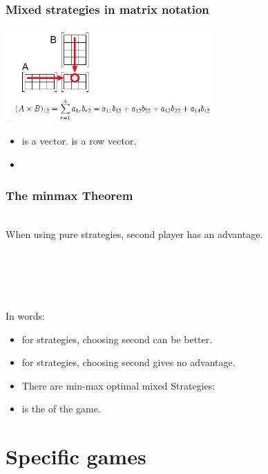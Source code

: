 \documentclass[handout]{beamer}
\begin{document}
\begin{frame}
  \frametitle{Mixed strategies in matrix notation}
  \includegraphics[width=8cm]{figures/matrixProduct.jpg}
\begin{itemize}
\item  \R{$\Q$} is a  vector.  is a row vector.
\item  {}
  \end{itemize}
\end{frame}

\begin{frame}
  \frametitle{The minmax Theorem}
~\\
When using pure strategies, second player has an advantage.
~\\~\\ ~\pause
{}
\\ ~ \\ 
\R{\[ \minp \maxq \mpq = \maxq \minp \mpq \]}
\\ ~ \\ 
In words:
\begin{itemize}
  \item for  strategies, choosing second can be better.
  \item for  strategies, choosing second gives no advantage.
  \item There are min-max optimal mixed Strategies: \R{$\P^*,\Q^*$}
  \item {} is the  of the game.
\end{itemize}
\end{frame}


\section{Specific games}
\end{document}
